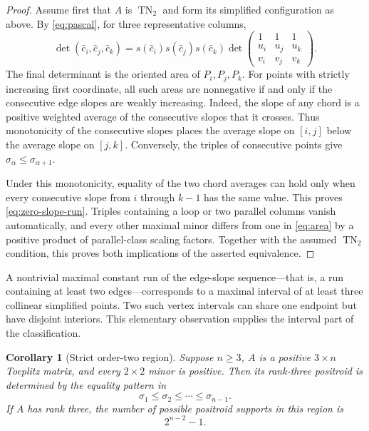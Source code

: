 \documentclass{amsart}
\numberwithin{equation}{section}
\newtheorem{corollary}[theorem]{Corollary}
\theoremstyle{definition}
\theoremstyle{remark}
\DeclareMathOperator{\TN}{TN}
\begin{document}
\begin{proof}
Assume first that $A$ is $\TN_2$ and form its simplified configuration as above.  By \eqref{eq:pascal}, for three representative columns,
\begin{equation}\label{eq:area}
 \det(\widehat c_i,\widehat c_j,\widehat c_k)
 =s(\widehat c_i)s(\widehat c_j)s(\widehat c_k)
 \det\begin{pmatrix}
 1&1&1\\
 u_i&u_j&u_k\\
 v_i&v_j&v_k
 \end{pmatrix}.
\end{equation}
The final determinant is the oriented area of $P_i,P_j,P_k$.  For points with strictly increasing first coordinate, all such areas are nonnegative if and only if the consecutive edge slopes are weakly increasing.  Indeed, the slope of any chord is a positive weighted average of the consecutive slopes that it crosses.  Thus monotonicity of the consecutive slopes places the average slope on $[i,j]$ below the average slope on $[j,k]$.  Conversely, the triples of consecutive points give $\sigma_\alpha\le\sigma_{\alpha+1}$.

Under this monotonicity, equality of the two chord averages can hold only when every consecutive slope from $i$ through $k-1$ has the same value.  This proves \eqref{eq:zero-slope-run}.  Triples containing a loop or two parallel columns vanish automatically, and every other maximal minor differs from one in \eqref{eq:area} by a positive product of parallel-class scaling factors.  Together with the assumed $\TN_2$ condition, this proves both implications of the asserted equivalence.
\end{proof}

A nontrivial maximal constant run of the edge-slope sequence---that is, a run containing at least two edges---corresponds to a maximal interval of at least three collinear simplified points.  Two such vertex intervals can share one endpoint but have disjoint interiors.  This elementary observation supplies the interval part of the classification.

\begin{corollary}[Strict order-two region]\label{cor:strict-count}
Suppose $n\ge3$, $A$ is a positive $3\times n$ Toeplitz matrix, and every $2\times2$ minor is positive.  Then its rank-three positroid is determined by the equality pattern in
\[
 \sigma_1\le\sigma_2\le\cdots\le\sigma_{n-1}.
\]
If $A$ has rank three, the number of possible positroid supports in this region is
\[
 2^{n-2}-1.
\]
\end{corollary}
\end{document}
